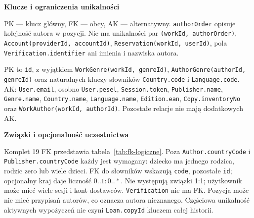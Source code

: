 \documentclass[11pt, a4paper]{article}
\begin{document}
\noindent\textbf{Klucze i ograniczenia unikalności}

PK --- klucz główny, FK --- obcy, AK --- alternatywny. \texttt{authorOrder} opisuje kolejność autora w pozycji. Nie ma unikalności par \texttt{(workId, authorOrder)}, \texttt{Account(providerId, accountId)}, \texttt{Reservation(workId, userId)}, pola \texttt{Verification.identifier} ani imienia i nazwiska autora.


PK to \texttt{id}, z wyjątkiem \texttt{WorkGenre(workId, genreId)}, \texttt{AuthorGenre(authorId, genreId)} oraz naturalnych kluczy słowników \texttt{Country.code} i \texttt{Language.code}. AK: \texttt{User.email}, osobno \texttt{User.pesel}, \texttt{Session.token}, \texttt{Publisher.name}, \texttt{Genre.name}, \texttt{Country.name}, \texttt{Language.name}, \texttt{Edition.ean}, \texttt{Copy.inventoryNo} oraz \texttt{WorkAuthor(workId, authorId)}. Pozostałe relacje nie mają dodatkowych AK.

\noindent\textbf{Związki i opcjonalność uczestnictwa}

Komplet 19 FK przedstawia tabela~\ref{tab:fk-logiczne}. Poza \texttt{Author.countryCode} i \texttt{Publisher.countryCode} każdy jest wymagany: dziecko ma jednego rodzica, rodzic zero lub wiele dzieci. FK do słowników wskazują \texttt{code}, pozostałe \texttt{id}; opcjonalny kraj daje liczność $0..1:0..*$. Nie występują związki 1:1; użytkownik może mieć wiele sesji i kont dostawców. \texttt{Verification} nie ma FK. Pozycja może nie mieć przypisań autorów, co oznacza autora nieznanego. Częściowa unikalność aktywnych wypożyczeń nie czyni \texttt{Loan.copyId} kluczem całej historii.
\end{document}
